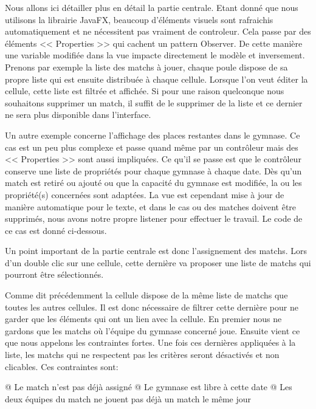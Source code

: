 \documentclass[final, noposter]{polytech/polytech}
\begin{document}
		Nous allons ici détailler plus en détail la partie centrale.
		Etant donné que nous utilisons la librairie JavaFX, beaucoup d'éléments visuels sont rafraichis automatiquement et ne nécessitent pas vraiment de controleur.
		Cela passe par des éléments << Properties >> qui cachent un pattern Observer.
		De cette manière une variable modifiée dans la vue impacte directement le modèle et inversement.
		Prenons par exemple la liste des matchs à jouer, chaque poule dispose de sa propre liste qui est ensuite distribuée à chaque cellule.
		Lorsque l'on veut éditer la cellule, cette liste est filtrée et affichée.
		Si pour une raison quelconque nous souhaitons supprimer un match, il suffit de le supprimer de la liste et ce dernier ne sera plus disponible dans l'interface.
		
		Un autre exemple concerne l'affichage des places restantes dans le gymnase.
		Ce cas est un peu plus complexe et passe quand même par un contrôleur mais des << Properties >> sont aussi impliquées.
		Ce qu'il se passe est que le contrôleur conserve une liste de propriétés pour chaque gymnase à chaque date.
		Dès qu'un match est retiré ou ajouté ou que la capacité du gymnase est modifiée, la ou les propriété(s) concernées sont adaptées.
		La vue est cependant mise à jour de manière automatique pour le texte, et dans le cas ou des matches doivent être supprimés, nous avons notre propre listener pour effectuer le travail.
		Le code de ce cas est donné ci-dessous.
		
		
		Un point important de la partie centrale est donc l'assignement des matchs.
		Lors d'un double clic sur une cellule, cette dernière va proposer une liste de matchs qui pourront être sélectionnés.
		
		
		Comme dit précédemment la cellule dispose de la même liste de matchs que toutes les autres cellules.
		Il est donc nécessaire de filtrer cette dernière pour ne garder que les éléments qui ont un lien avec la cellule.
		En premier nous ne gardons que les matchs où l'équipe du gymnase concerné joue.
		Ensuite vient ce que nous appelons les contraintes fortes.
		Une fois ces dernières appliquées à la liste, les matchs qui ne respectent pas les critères seront désactivés et non clicables.
		Ces contraintes sont:
		\begin{easylist}[itemize]
			@ Le match n'est pas déjà assigné
			@ Le gymnase est libre à cette date
			@ Les deux équipes du match ne jouent pas déjà un match le même jour
		\end{easylist}
	
\end{document}
